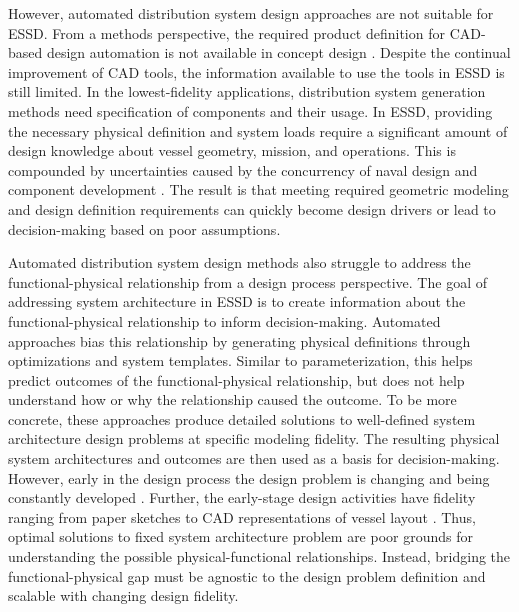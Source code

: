 \documentclass[preprint,12pt]{elsarticle}
\begin{document}
However, automated distribution system design approaches are not suitable for ESSD. From a methods perspective, the required product definition for CAD-based design automation is not available in concept design \citep{Mistree1990}. Despite the continual improvement of CAD tools, the information available to use the tools in ESSD is still limited. In the lowest-fidelity applications, distribution system generation methods need specification of components and their usage. In ESSD, providing the necessary physical definition and system loads require a significant amount of design knowledge about vessel geometry, mission, and operations. This is compounded by uncertainties caused by the concurrency of naval design and component development \citep{GovernmentAccountabilityOffice2009,NAVSEA2012,Kassel2010}. The result is that meeting required geometric modeling and design definition requirements can quickly become design drivers \citep{Pitts1970} or lead to decision-making based on poor assumptions.

Automated distribution system design methods also struggle to address the functional-physical relationship from a design process perspective. The goal of addressing system architecture in ESSD is to create information about the functional-physical relationship to inform decision-making. Automated approaches bias this relationship by generating physical definitions through optimizations and system templates. Similar to parameterization, this helps predict outcomes of the functional-physical relationship, but does not help understand how or why the relationship caused the outcome. To be more concrete, these approaches produce detailed solutions to well-defined system architecture design problems at specific modeling fidelity. The resulting physical system architectures and outcomes are then used as a basis for decision-making. However, early in the design process the design problem is changing and being constantly developed \citep{Andrews1981}. Further, the early-stage design activities have fidelity ranging from paper sketches to CAD representations of vessel layout \citep{Andrews1981,Chandrasegaran2013}. Thus, optimal solutions to fixed system architecture problem are poor grounds for understanding the possible physical-functional relationships. Instead, bridging the functional-physical gap must be agnostic to the design problem definition and scalable with changing design fidelity.
\end{document}
